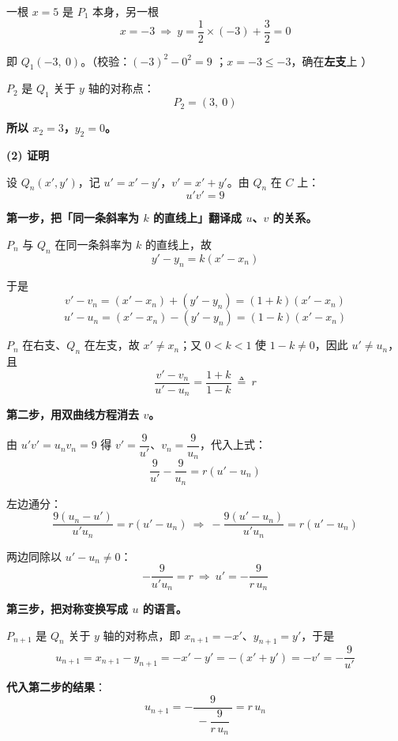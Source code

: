 \begin{answer}
一根 $x=5$ 是 $P_1$ 本身，另一根
\nopagebreak[4]
\[x=-3\ \Longrightarrow\ y=\frac12\times(-3)+\frac32=0\]

即 $Q_1(-3,\ 0)$。（校验：$(-3)^{2}-0^{2}=9$ ；$x=-3\le-3$，确在\textbf{左支}上 ）

$P_2$ 是 $Q_1$ 关于 $y$ 轴的对称点：
\nopagebreak[4]
\[P_2=(3,\ 0)\]

\textbf{所以 $x_2=3$，$y_2=0$。}

\par\medskip

\textbf{(2) 证明}

设 $Q_n\left(x',y'\right)$，记 $u'=x'-y'$，$v'=x'+y'$。由 $Q_n$ 在 $C$ 上：
\nopagebreak[4]
\[u'v'=9\]

\textbf{第一步，把「同一条斜率为 $k$ 的直线上」翻译成 $u$、$v$ 的关系。}

$P_n$ 与 $Q_n$ 在同一条斜率为 $k$ 的直线上，故
\nopagebreak[4]
\[y'-y_n=k\left(x'-x_n\right)\]

于是
\nopagebreak[4]
\[v'-v_n=\left(x'-x_n\right)+\left(y'-y_n\right)=(1+k)\left(x'-x_n\right)\]
\nopagebreak[4]
\[u'-u_n=\left(x'-x_n\right)-\left(y'-y_n\right)=(1-k)\left(x'-x_n\right)\]

$P_n$ 在右支、$Q_n$ 在左支，故 $x'\ne x_n$；又 $0<k<1$ 使 $1-k\ne0$，因此 $u'\ne u_n$，且
\nopagebreak[4]
\[\frac{v'-v_n}{u'-u_n}=\frac{1+k}{1-k}\ \triangleq\ r\]

\textbf{第二步，用双曲线方程消去 $v$。}

由 $u'v'=u_nv_n=9$ 得 $v'=\dfrac9{u'}$、$v_n=\dfrac9{u_n}$，代入上式：
\nopagebreak[4]
\[\frac9{u'}-\frac9{u_n}=r\left(u'-u_n\right)\]

左边通分：
\nopagebreak[4]
\[\frac{9\left(u_n-u'\right)}{u'u_n}=r\left(u'-u_n\right)\ \Longrightarrow\ -\frac{9\left(u'-u_n\right)}{u'u_n}=r\left(u'-u_n\right)\]

两边同除以 $u'-u_n\ne0$：
\nopagebreak[4]
\[-\frac9{u'u_n}=r\ \Longrightarrow\ u'=-\frac9{r\,u_n}\]

\textbf{第三步，把对称变换写成 $u$ 的语言。}

$P_{n+1}$ 是 $Q_n$ 关于 $y$ 轴的对称点，即 $x_{n+1}=-x'$、$y_{n+1}=y'$，于是
\nopagebreak[4]
\[u_{n+1}=x_{n+1}-y_{n+1}=-x'-y'=-\left(x'+y'\right)=-v'=-\frac9{u'}\]

\textbf{代入第二步的结果}：
\nopagebreak[4]
\[u_{n+1}=-\frac9{\ -\dfrac9{r\,u_n}\ }=r\,u_n\]


\end{answer}
